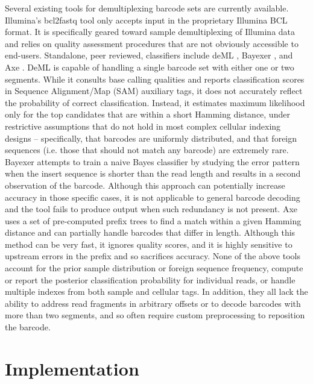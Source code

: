 \documentclass[10pt,twocolumn]{article}
\begin{document}
Several existing tools for demultiplexing barcode sets are currently available. Illumina's bcl2fastq tool only accepts input in the proprietary Illumina BCL format. It is specifically geared toward sample demultiplexing of Illumina data and relies on quality assessment procedures that are not obviously accessible to end-users. Standalone, peer reviewed, classifiers include deML \citep{doi:10.1093/bioinformatics/btu719}, Bayexer \citep{doi:10.1093/bioinformatics/btv501}, and Axe \citep{doi:10.1093/bioinformatics/bty432}. DeML is capable of handling a single barcode set with either one or two segments. While it consults base calling qualities and reports classification scores in Sequence Alignment/Map (SAM) \citep{doi:10.1093/bioinformatics/btp352} auxiliary tags, it does not accurately reflect the probability of correct classification. Instead, it estimates maximum likelihood only for the top candidates that are within a short Hamming distance, under restrictive assumptions that do not hold in most complex cellular indexing designs -- specifically, that barcodes are uniformly distributed, and that foreign sequences (i.e. those that should not match any barcode) are extremely rare. Bayexer attempts to train a naive Bayes classifier by studying the error pattern when the insert sequence is shorter than the read length and results in a second observation of the barcode. Although this approach can potentially increase accuracy in those specific cases, it is not applicable to general barcode decoding and the tool fails to produce output when such redundancy is not present. Axe uses a set of pre-computed prefix trees to find a match within a given Hamming distance and can partially handle barcodes that differ in length. Although this method can be very fast, it ignores quality scores, and it is highly sensitive to upstream errors in the prefix and so sacrifices accuracy. None of the above tools account for the prior sample distribution or foreign sequence frequency, compute or report the posterior classification probability for individual reads, or handle multiple indexes from both sample and cellular tags. In addition, they all lack the ability to address read fragments in arbitrary offsets or to decode barcodes with more than two segments, and so often require custom preprocessing to reposition the barcode.

\section*{Implementation}
\end{document}
